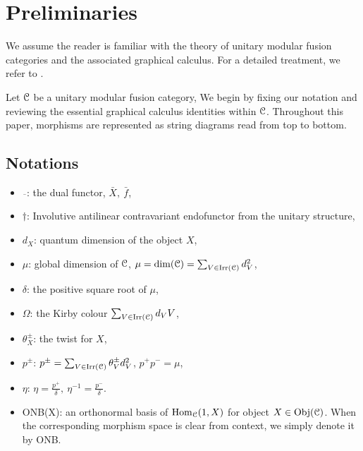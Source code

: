 \documentclass{amsart}
\begin{document}
\section{Preliminaries}
We assume the reader is familiar with the theory of unitary modular fusion categories and the associated graphical calculus. For a detailed treatment, we refer to \cite{BK01, EGNO, Row05f, Tur10}.

Let ${\mathcal{C}}$ be a unitary modular fusion category, We begin by fixing our notation and reviewing the essential graphical calculus identities within ${\mathcal{C}}$. Throughout this paper, morphisms are represented as string diagrams read from top to bottom.

\subsection{Notations}
\begin{itemize}
    \item $\overline{\ \ }$: the dual functor, $\bar{X},\ \bar{f}$,
    \item $\dagger$:  Involutive antilinear contravariant endofunctor from the unitary structure,   
    \item $d_X$: quantum dimension of the object $X$,
    \item $\mu$: global dimension of ${\mathcal{C}}$,  $\mu=\dim({\mathcal{C}})=\sum_{V\in \operatorname{Irr}({\mathcal{C}})}d^2_V$,
    \item $\delta$: the positive square root of $\mu$,
    \item $\Omega$: the Kirby colour $\sum_{V\in \operatorname{Irr}({\mathcal{C}})}d_V V$,
    \item $\theta^{\pm}_X$: the twist for $X$,
    \item $p^{\pm}$: $p^{\pm}=\sum_{V\in \operatorname{Irr}({\mathcal{C}})}\theta^{\pm}_Vd_V^2$, $p^+p^-=\mu$,
    \item $\eta$: $\eta=\frac{p^+}{\delta},\  \eta^{-1}=\frac{p^-}{\delta}$.
     \item ONB(X): an orthonormal basis of $\operatorname{Hom}_{{\mathcal{C}}}(1,X)$ for object $X\in \operatorname{Obj}({\mathcal{C}}
     )$. When the corresponding morphism space is clear from context, we simply denote it by ONB.
    \end{itemize}
\end{document}
